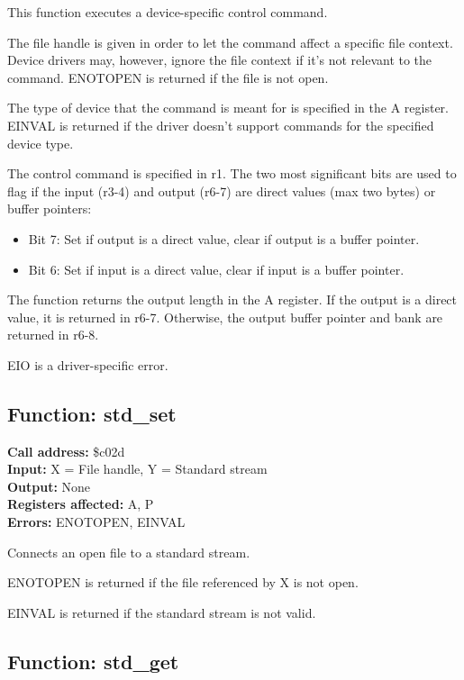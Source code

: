 This function executes a device-specific control command.

The file handle is given in order to let the command affect a specific file context. 
Device drivers may, however, ignore the file context if it's not relevant to the command.
ENOTOPEN is returned if the file is not open. 

The type of device that the command is meant for is specified in the A register. EINVAL 
is returned if the driver doesn't support commands for the specified device type.

The control command is specified in r1. The two most significant bits are used to flag if the input 
(r3-4) and output (r6-7) are direct values (max two bytes) or buffer pointers:

\begin{itemize}
    \item Bit 7: Set if output is a direct value, clear if output is a buffer pointer.
    \item Bit 6: Set if input is a direct value, clear if input is a buffer pointer.
\end{itemize}

The function returns the output length in the A register. If the output is a direct value, it is returned
in r6-7. Otherwise, the output buffer pointer and bank are returned in r6-8.

EIO is a driver-specific error.


\subsection{Function: std\_set}

\textbf{Call address:} \$c02d\\
\textbf{Input:} X = File handle, Y = Standard stream \\
\textbf{Output:} None \\
\textbf{Registers affected:} A, P \\
\textbf{Errors:} ENOTOPEN, EINVAL

Connects an open file to a standard stream.

ENOTOPEN is returned if the file referenced by X is not open.

EINVAL is returned if the standard stream is not valid.


\subsection{Function: std\_get}

